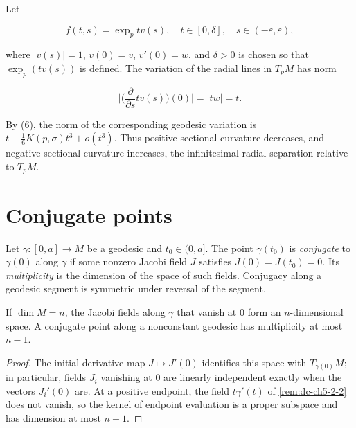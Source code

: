 \begin{remark}
  \label{rem:dc-ch5-2-11}
  Let
  
  $$
  f(t,s)=\exp_p tv(s),\quad t\in[0,\delta],\quad s\in(-\varepsilon,\varepsilon),
  $$
  
  where $|v(s)|=1$, $v(0)=v$, $v'(0)=w$, and $\delta>0$ is chosen so that
  $\exp_p(tv(s))$ is defined. The variation of the radial lines in $T_pM$ has
  norm
  
  $$
  \Big|\Big(\frac{\partial}{\partial s}tv(s)\Big)(0)\Big|=|tw|=t.
  $$
  
  By (6), the norm of the corresponding geodesic variation is
  $t-\frac16K(p,\sigma)t^3+o(t^3)$. Thus positive sectional curvature decreases,
  and negative sectional curvature increases, the infinitesimal radial
  separation relative to $T_pM$.
\end{remark}

\section{Conjugate points}

\begin{definition}
  \label{def:dc-ch5-3-1}
  \leanok
  Let $\gamma:[0,a]\to M$ be a geodesic and $t_0\in(0,a]$. The point
  $\gamma(t_0)$ is \emph{conjugate} to $\gamma(0)$ along $\gamma$ if some
  nonzero Jacobi field $J$ satisfies $J(0)=J(t_0)=0$. Its \emph{multiplicity}
  is the dimension of the space of such fields. Conjugacy along a geodesic
  segment is symmetric under reversal of the segment.
\end{definition}

\begin{remark}
  \label{rem:dc-ch5-3-2}
  \leanok
  If $\dim M=n$, the Jacobi fields along $\gamma$ that vanish at $0$ form an
  $n$-dimensional space. A conjugate point along a nonconstant geodesic has
  multiplicity at most $n-1$.
\end{remark}
\begin{proof}

  \sketch
  The initial-derivative map $J\mapsto J'(0)$ identifies this space with
  $T_{\gamma(0)}M$; in particular, fields $J_i$ vanishing at $0$ are linearly
  independent exactly when the vectors $J_i'(0)$ are. At a positive endpoint,
  the field $t\gamma'(t)$ of \cref{rem:dc-ch5-2-2} does not vanish, so the kernel
  of endpoint evaluation is a proper subspace and has dimension at most $n-1$.
\end{proof}

